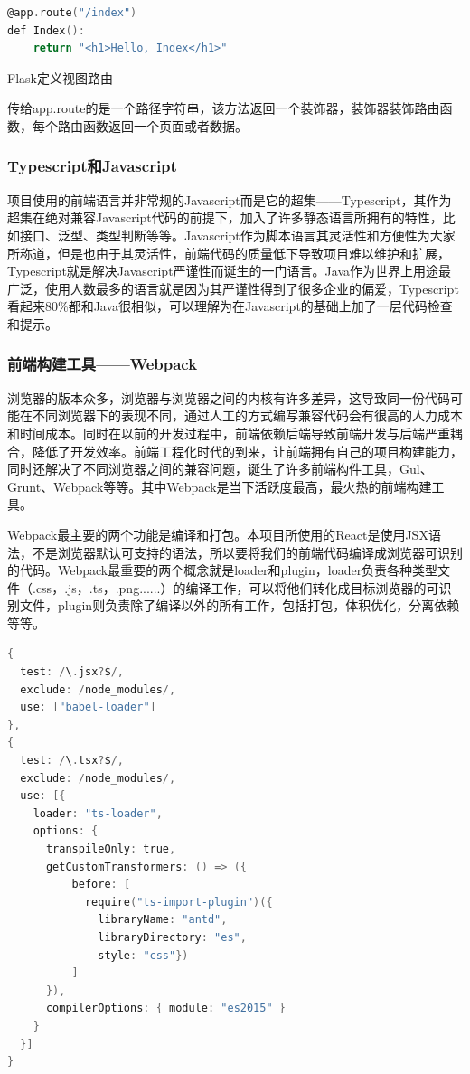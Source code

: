 \begin{lstlisting}[language=C]
@app.route("/index")
def Index():
	return "<h1>Hello, Index</h1>"
\end{lstlisting}

\begin{center}
	{\small Flask定义视图路由}
\end{center}

传给app.route的是一个路径字符串，该方法返回一个装饰器，装饰器装饰路由函数，每个路由函数返回一个页面或者数据。

\subsubsection{Typescript和Javascript}

项目使用的前端语言并非常规的Javascript而是它的超集——Typescript，其作为超集在绝对兼容Javascript代码的前提下，加入了许多静态语言所拥有的特性，比如接口、泛型、类型判断等等。Javascript作为脚本语言其灵活性和方便性为大家所称道，但是也由于其灵活性，前端代码的质量低下导致项目难以维护和扩展，Typescript就是解决Javascript严谨性而诞生的一门语言。Java作为世界上用途最广泛，使用人数最多的语言就是因为其严谨性得到了很多企业的偏爱，Typescript看起来80\%都和Java很相似，可以理解为在Javascript的基础上加了一层代码检查和提示。

\subsubsection{前端构建工具——Webpack}

浏览器的版本众多，浏览器与浏览器之间的内核有许多差异，这导致同一份代码可能在不同浏览器下的表现不同，通过人工的方式编写兼容代码会有很高的人力成本和时间成本。同时在以前的开发过程中，前端依赖后端导致前端开发与后端严重耦合，降低了开发效率。前端工程化时代的到来，让前端拥有自己的项目构建能力，同时还解决了不同浏览器之间的兼容问题，诞生了许多前端构件工具，Gul、Grunt、Webpack等等。其中Webpack是当下活跃度最高，最火热的前端构建工具。

Webpack最主要的两个功能是编译和打包。本项目所使用的React是使用JSX语法，不是浏览器默认可支持的语法，所以要将我们的前端代码编译成浏览器可识别的代码。Webpack最重要的两个概念就是loader和plugin，loader负责各种类型文件（.css，.js，.ts，.png......）的编译工作，可以将他们转化成目标浏览器的可识别文件，plugin则负责除了编译以外的所有工作，包括打包，体积优化，分离依赖等等。

\begin{lstlisting}[language=C]
{
  test: /\.jsx?$/,
  exclude: /node_modules/,
  use: ["babel-loader"]
},
{
  test: /\.tsx?$/,
  exclude: /node_modules/,
  use: [{
    loader: "ts-loader",
    options: {
      transpileOnly: true,
      getCustomTransformers: () => ({
          before: [
            require("ts-import-plugin")({
              libraryName: "antd",
              libraryDirectory: "es",
              style: "css"})
          ]
      }),
      compilerOptions: { module: "es2015" }
    }
  }]
}
\end{lstlisting}

